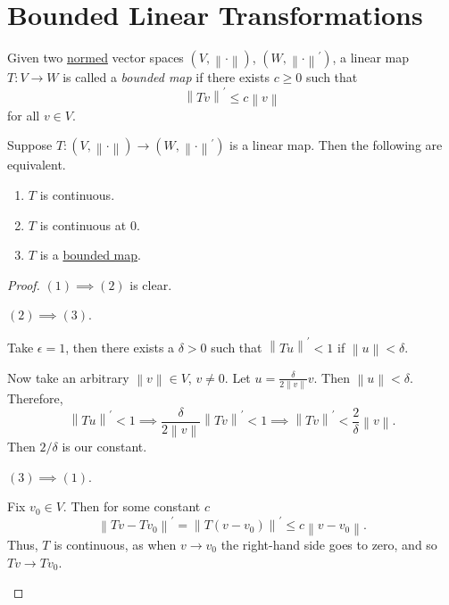 \section{Bounded Linear Transformations}
\begin{definition}\label{def:bounded-linear-transformation}
	Given two \hyperref[def:norm]{normed} vector spaces \((V,\left\lVert \cdot\right\rVert )\), \((W,\left\lVert \cdot\right\rVert^\prime )\),
	a linear map \(T \colon V \to W\) is called a \emph{bounded map} if there exists \(c \geq 0\) such that
	\[
		\left\lVert Tv\right\rVert^\prime \leq c\left\lVert v\right\rVert
	\]
	for all \(v \in V\).
\end{definition}

\begin{proposition}
	Suppose \(T \colon (V, \left\lVert \cdot\right\rVert) \to (W, \left\lVert \cdot\right\rVert^\prime )\) is a linear map. Then the following are equivalent.
	\begin{enumerate}[(1)]
		\item \(T\) is continuous.
		\item \(T\) is continuous at \(0\).
		\item \(T\) is a \hyperref[def:bounded-linear-transformation]{bounded map}.
	\end{enumerate}
\end{proposition}
\begin{proof}
	\((1)\implies(2)\) is clear.
	\begin{claim}
		\((2)\implies(3)\).
	\end{claim}
	\begin{explanation}
		Take \(\epsilon = 1\), then there exists a \(\delta > 0\) such that \(\left\lVert Tu\right\rVert^\prime < 1\)
		if \(\left\lVert u\right\rVert < \delta\).

		Now take an arbitrary \(\left\lVert v \right\rVert\in V\), \(v \neq 0\). Let \(u = \frac{\delta}{2\left\lVert v\right\rVert}v\). Then \(\left\lVert u\right\rVert < \delta\).
		Therefore,
		\[
			\left\lVert Tu\right\rVert ^\prime <1 \implies \frac{\delta }{2\left\lVert v\right\rVert }\left\lVert Tv\right\rVert ^\prime < 1\implies \left\lVert Tv\right\rVert ^\prime < \frac{2}{\delta }\left\lVert v\right\rVert .
		\]
		Then \(2/\delta\) is our constant.
	\end{explanation}
	\begin{claim}
		\((3)\implies (1)\).
	\end{claim}
	\begin{explanation}
		Fix \(v_0 \in V\). Then for some constant \(c\)
		\[
			\left\lVert Tv - Tv_0\right\rVert^\prime = \left\lVert T(v - v_0)\right\rVert ^\prime \leq c\left\lVert v - v_0\right\rVert.
		\]
		Thus, \(T\) is continuous, as when \(v \to v_0\) the right-hand side goes to zero, and so \(Tv \to Tv_0\).
	\end{explanation}
\end{proof}

